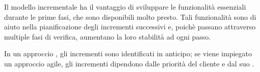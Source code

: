 
Il modello incrementale ha il vantaggio di sviluppare le funzionalità essenziali durante le prime fasi, che sono disponibili molto presto. Tali funzionalità sono di aiuto nella pianificazione degli incrementi successivi e, poichè passano attraverso multiple fasi di verifica, aumentano la loro stabilità ad ogni passo.

In un approccio , gli incrementi sono identificati in anticipo; se viene impiegato un approccio agile, gli incrementi dipendono dalle priorità del cliente e dal suo .


